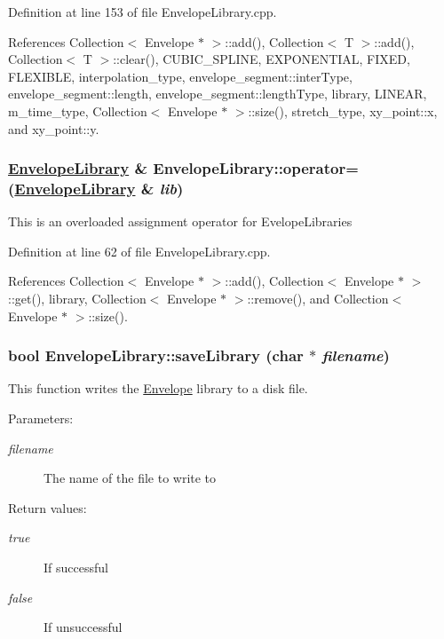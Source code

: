 Definition at line 153 of file Envelope\-Library.cpp.

References Collection$<$ Envelope $\ast$ $>$::add(), Collection$<$ T $>$::add(), Collection$<$ T $>$::clear(), CUBIC\_\-SPLINE, EXPONENTIAL, FIXED, FLEXIBLE, interpolation\_\-type, envelope\_\-segment::inter\-Type, envelope\_\-segment::length, envelope\_\-segment::length\-Type, library, LINEAR, m\_\-time\_\-type, Collection$<$ Envelope $\ast$ $>$::size(), stretch\_\-type, xy\_\-point::x, and xy\_\-point::y.\hypertarget{classEnvelopeLibrary_a3}{
\subsubsection[operator=]{\setlength{\rightskip}{0pt plus 5cm}\hyperlink{classEnvelopeLibrary}{Envelope\-Library} \& Envelope\-Library::operator= (\hyperlink{classEnvelopeLibrary}{Envelope\-Library} \& {\em lib})}}
\label{classEnvelopeLibrary_a3}


This is an overloaded assignment operator for Evelope\-Libraries 

Definition at line 62 of file Envelope\-Library.cpp.

References Collection$<$ Envelope $\ast$ $>$::add(), Collection$<$ Envelope $\ast$ $>$::get(), library, Collection$<$ Envelope $\ast$ $>$::remove(), and Collection$<$ Envelope $\ast$ $>$::size().\hypertarget{classEnvelopeLibrary_a4}{
\subsubsection[saveLibrary]{\setlength{\rightskip}{0pt plus 5cm}bool Envelope\-Library::save\-Library (char $\ast$ {\em filename})}}
\label{classEnvelopeLibrary_a4}


This function writes the \hyperlink{classEnvelope}{Envelope} library to a disk file. \begin{Desc}
\item[Parameters:]
\begin{description}
\item[{\em filename}]The name of the file to write to \end{description}
\end{Desc}
\begin{Desc}
\item[Return values:]
\begin{description}
\item[{\em true}]If successful \item[{\em false}]If unsuccessful \end{description}
\end{Desc}


